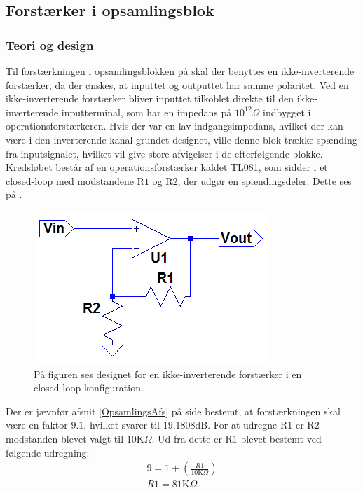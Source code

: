\subsection{Forstærker i opsamlingsblok}\label{Subsec:Forstaerker}
\subsubsection{Teori og design}
Til forstærkningen i opsamlingsblokken på  skal der benyttes en ikke-inverterende forstærker, da der ønskes, at inputtet og outputtet har samme polaritet. Ved en ikke-inverterende forstærker bliver inputtet tilkoblet direkte til den ikke-inverterende inputterminal, som har en impedans på $10^{12}\Omega$ indbygget i operationsforstærkeren. Hvis der var en lav indgangsimpedans, hvilket der kan være i den inverterende kanal grundet designet, ville denne blok trække spænding fra inputsignalet, hvilket vil give store afvigelser i de efterfølgende blokke. \\
Kredsløbet består af en operationsforstærker kaldet TL081, som sidder i et closed-loop med modstandene R$1$ og R$2$, der udgør en spændingsdeler. Dette ses på .
\begin{figure}[H]
\centering
\includegraphics[scale=0.75]{figures/cProblemloesning/Forstaerker.PNG}
\caption{På figuren ses designet for en ikke-inverterende forstærker i en closed-loop konfiguration.}
\label{fig:Forstaerker}
\end{figure} 

\noindent Der er jævnfør afsnit \ref{OpsamlingsAfs} på side \pageref{OpsamlingsAfs} bestemt, at forstærkningen skal være en faktor $9.1$, hvilket svarer til $19.1808$dB. For at udregne R$1$ er R$2$ modstanden blevet valgt til $10$K$\Omega$. \cite{Nilsson2011} Ud fra dette er R$1$ blevet bestemt ved følgende udregning:
\begin{align}
9 = 1 + (\frac{R1}{10\text{K}\Omega})\\
R1 = 81\text{K}\Omega
\end{align}

